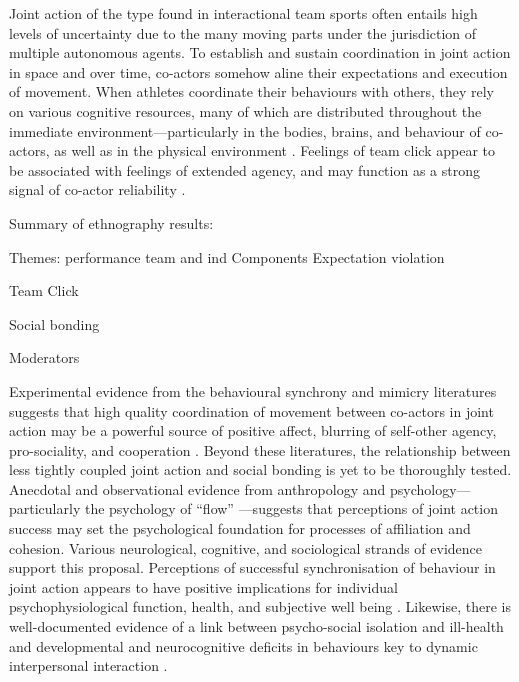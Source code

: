 \begin{CJK}{UTF8}{gbsn}
 Joint action of the type found in interactional team sports often entails high levels of uncertainty due to the many moving parts under the jurisdiction of multiple autonomous agents.  To establish and sustain coordination in joint action in space and over time, co-actors somehow aline their expectations and execution of movement. When athletes coordinate their behaviours with others, they rely on various cognitive resources, many of which are distributed throughout the immediate environment---particularly in the bodies, brains, and behaviour of co-actors, as well as in the physical environment \citep{Clark2015,Bourbousson2016,VanderWel2012}.  Feelings of team click appear to be associated with feelings of extended agency, and may function as a strong signal of co-actor reliability \citep{Reddish2013a}.




 Summary of ethnography results:

       Themes:
        performance
           team and ind
           Components
           Expectation violation

       Team Click

       Social bonding

       Moderators





Experimental evidence from the behavioural synchrony and mimicry literatures suggests that high quality coordination of movement between co-actors in joint action may be a powerful source of positive affect, blurring of self-other agency, pro-sociality, and cooperation \citep{Mogan2017}. Beyond these literatures, the relationship between less tightly coupled joint action and social bonding is yet to be thoroughly tested.  Anecdotal and observational evidence from anthropology and psychology---particularly the psychology of ``flow'' \citep{Csikszentmihalyi1992,Jackson1999}---suggests that perceptions of joint action success may set the psychological foundation for processes of affiliation and cohesion.  Various neurological, cognitive, and sociological strands of evidence support this proposal.  Perceptions of successful synchronisation of behaviour in joint action appears to have positive implications for individual psychophysiological function, health, and subjective well being \citep{Wheatley2012}.  Likewise, there is well-documented evidence of a link between psycho-social isolation and ill-health and developmental and neurocognitive deficits in behaviours key to dynamic interpersonal interaction \citep[e.g.][]{Blakemore2005,Baron-Cohen1991}.


\end{CJK}
